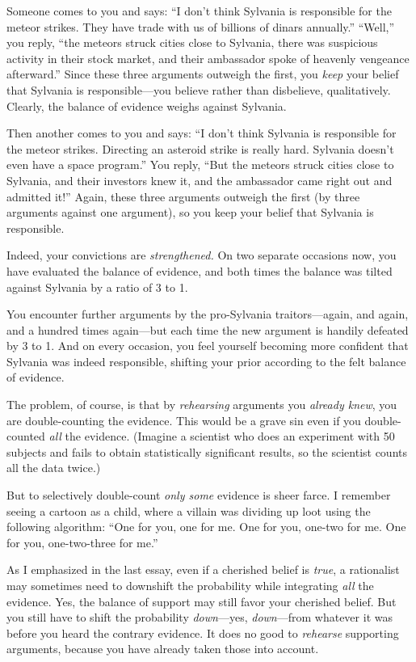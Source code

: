 {
 Someone comes to you and says: ``I
don't think Sylvania is responsible for the meteor
strikes. They have trade with us of billions of dinars
annually.''
``Well,'' you reply,
``the meteors struck cities close to Sylvania, there
was suspicious activity in their stock market, and their ambassador
spoke of heavenly vengeance afterward.'' Since these
three arguments outweigh the first, you \textit{keep} your belief that
Sylvania is responsible---you believe rather than disbelieve,
qualitatively. Clearly, the balance of evidence weighs against
Sylvania.}

{
 Then another comes to you and says: ``I
don't think Sylvania is responsible for the meteor
strikes. Directing an asteroid strike is really hard. Sylvania
doesn't even have a space program.''
You reply, ``But the meteors struck cities close to
Sylvania, and their investors knew it, and the ambassador came right
out and admitted it!'' Again, these three arguments
outweigh the first (by three arguments against one argument), so you
keep your belief that Sylvania is responsible.}

{
 Indeed, your convictions are \textit{strengthened.} On two
separate occasions now, you have evaluated the balance of evidence, and
both times the balance was tilted against Sylvania by a ratio of 3 to
1.}

{
 You encounter further arguments by the pro-Sylvania
traitors---again, and again, and a hundred times again---but each time
the new argument is handily defeated by 3 to 1. And on every occasion,
you feel yourself becoming more confident that Sylvania was indeed
responsible, shifting your prior according to the felt balance of
evidence.}

{
 The problem, of course, is that by \textit{rehearsing} arguments
you \textit{already knew}, you are double-counting the evidence. This
would be a grave sin even if you double-counted \textit{all} the
evidence. (Imagine a scientist who does an experiment with 50 subjects
and fails to obtain statistically significant results, so the scientist
counts all the data twice.)}

{
 But to selectively double-count \textit{only some} evidence is
sheer farce. I remember seeing a cartoon as a child, where a villain
was dividing up loot using the following algorithm:
``One for you, one for me. One for you, one-two for
me. One for you, one-two-three for me.''}

{
 As I emphasized in the last essay, even if a cherished belief is
\textit{true}, a rationalist may sometimes need to downshift the
probability while integrating \textit{all} the evidence. Yes, the
balance of support may still favor your cherished belief. But you still
have to shift the probability \textit{down}{}---yes,
\textit{down}{}---from whatever it was before you heard the contrary
evidence. It does no good to \textit{rehearse} supporting arguments,
because you have already taken those into account.}

